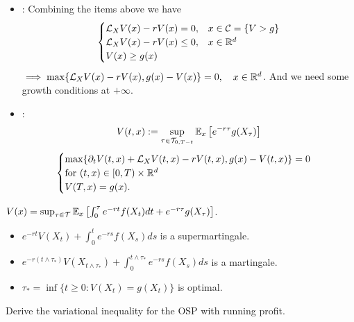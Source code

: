 \begin{itemize}
    \item {}: Combining the items above we have
    \begin{equation*}
        \begin{cases}
            \mathcal{L}_X V(x) - rV(x) = 0, & x \in \mathcal{C} = \{ V > g \} \\
            \mathcal{L}_X V(x) - rV(x) \leq 0, & x \in \mathbb R^d \\
            V(x) \geq g(x)
        \end{cases}
    \end{equation*}
    $\implies \max \{ \mathcal{L}_X V(x) - rV(x), g(x) - V(x) \} = 0, \quad x \in \mathbb R^d$.
    And we need some growth conditions at $+\infty$.
    
    \item {}:
    \begin{equation*}
        V(t,x) := \sup_{\tau \in \mathcal{T}_{0, T-t}} \mathbb E_x \left[ e^{-r\tau} g(X_\tau) \right]
    \end{equation*}
    \begin{equation*}
        \begin{cases}
            \max \{ \partial_t V(t,x) + \mathcal{L}_X V(t,x) - rV(t,x), g(x) - V(t,x) \} = 0 \\
            \text{for } (t,x) \in [0,T) \times \mathbb R^d \\
            V(T,x) = g(x).
        \end{cases}
    \end{equation*}
\end{itemize}

\begin{remark}
    $V(x) = \sup_{\tau \in \mathcal{T}} \mathbb E_x \left[ \int_0^\tau e^{-rt} f(X_t) dt + e^{-r\tau} g(X_\tau) \right]$.
    \begin{itemize}
        \item $e^{-rt} V(X_t) + \int_0^t e^{-rs} f(X_s) ds$ is a supermartingale.
        \item $e^{-r(t \wedge \tau_*)} V(X_{t \wedge \tau_*}) + \int_0^{t \wedge \tau_*} e^{-rs} f(X_s) ds$ is a martingale.
        \item $\tau_* = \inf \{ t \geq 0 : V(X_t) = g(X_t) \}$ is optimal.
    \end{itemize}
\end{remark}

\begin{homework}
    Derive the variational inequality for the OSP with running profit.
\end{homework}


